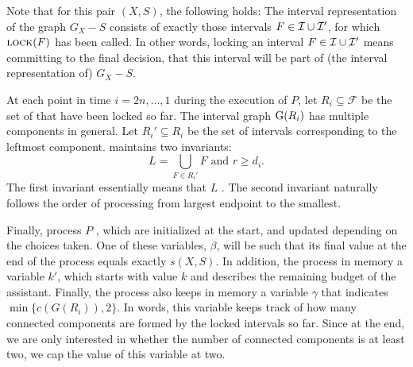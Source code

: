 Note that for this pair $(X,S)$, the following holds: The interval representation of the graph $G_X - S$ consists of exactly those intervals $F \in \mathcal{I} \cup \mathcal{I}'$, for which $\textsc{lock}(F)$ has been called. In other words, locking an interval $F \in \mathcal{I} \cup \mathcal{I}'$ means committing to the final decision, that this interval will be part of (the interval representation of) $G_X - S$. 

At each point in time $i = 2n, \dots, 1$ during the execution of $P$, let $R_i \subseteq \mathcal{F}$ be the set of  that have been locked so far. The interval graph $\operatorname{G}(R_i)$ has multiple components in general. Let $R_i' \subseteq R_i$ be the set of intervals corresponding to the leftmost component.  maintains two invariants: 
\begin{equation}
\label{eq:invariant_lock_in_alg}
L = \bigcup_{F \in R_i'}F \text{ and } r \geq d_i. 
\end{equation}
The first invariant essentially means that $L$ . The second invariant naturally follows the order of processing from largest endpoint to the smallest. 

Finally, process $P$ , which are initialized at the start, and updated depending on the choices taken. One of these variables, $\beta$, will be such that its final value at the end of the process equals exactly $s(X, S)$.  In addition, the process  in memory a variable $k'$, which starts with value $k$ and describes the remaining budget of the assistant.
Finally, the process also keeps in memory a variable $\gamma$ that indicates $\min\{c(G(R_i)),2\}$.
In words, this variable keeps track of how many connected components are formed by the locked intervals so far.
Since at the end, we are only interested in whether the number of connected components is at least two, we cap the value of this variable at two.

